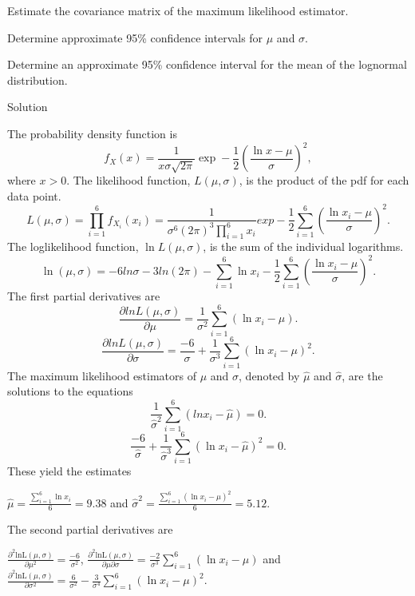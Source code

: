 \documentclass[]{book}
\begin{document}
Estimate the covariance matrix of the maximum likelihood estimator.

Determine approximate 95\% confidence intervals for \(\mu\) and
\(\sigma\).

Determine an approximate 95\% confidence interval for the mean of the
lognormal distribution.

Solution

The probability density function is
\[f_{X}\left( x \right) = \frac{1}{x \sigma \sqrt{2\pi}}\exp - \frac{1}{2}\left( \frac{\ln x - \mu}{\sigma} \right)^{2},\]
where \(x > 0\). The likelihood function,
\(L\left( \mu,\sigma \right)\), is the product of the pdf for each data
point.
\[L\left( \mu,\sigma \right) = \prod_{i = 1}^{6}{f_{X_{i}}\left( x_{i} \right)} = \frac{1}{\sigma^{6}\left( 2\pi \right)^{3}\prod_{i = 1}^{6}x_{i}}exp - \frac{1}{2}\sum_{i = 1}^{6}\left( \frac{\ln x_{i} - \mu}{\sigma} \right)^{2}.\]
The loglikelihood function, \(\ln L \left( \mu,\sigma \right)\), is the
sum of the individual logarithms.
\[\ln \left( \mu,\sigma \right) = - 6ln\sigma - 3ln\left( 2\pi \right) - \sum_{i = 1}^{6}\ln x_{i} - \frac{1}{2}\sum_{i = 1}^{6}\left( \frac{\ln x_{i} - \mu}{\sigma} \right)^{2}.\]
The first partial derivatives are
\[\frac{\partial lnL\left( \mu,\sigma \right)}{\partial\mu} = \frac{1}{\sigma^{2}}\sum_{i = 1}^{6}\left( \ln x_{i} - \mu \right).\]
\[\frac{\partial lnL\left( \mu,\sigma \right)}{\partial\sigma} = \frac{- 6}{\sigma} + \frac{1}{\sigma^{3}}\sum_{i = 1}^{6}\left( \ln x_{i} - \mu \right)^{2}.\]
The maximum likelihood estimators of \(\mu\) and \(\sigma\), denoted by
\(\hat{\mu}\) and \(\hat{\sigma}\), are the solutions to the equations
\[\frac{1}{{\hat{\sigma}}^{2}}\sum_{i = 1}^{6}\left( lnx_{i} - \hat{\mu} \right) = 0.\]
\[\frac{- 6}{\hat{\sigma}} + \frac{1}{{\hat{\sigma}}^{3}}\sum_{i = 1}^{6}\left( \ln x_{i} - \hat{\mu} \right)^{2} = 0.\]
These yield the estimates

\(\hat{\mu} = \frac{\sum_{i = 1}^{6}{\ln x_{i}}}{6} = 9.38\) and
\({\hat{\sigma}}^{2} = \frac{\sum_{i = 1}^{6}\left( \ln x_{i} - \hat{\mu} \right)^{2}}{6} = 5.12\).

The second partial derivatives are

\(\frac{\partial^{2}\text{lnL}\left( \mu,\sigma \right)}{\partial\mu^{2}} = \frac{- 6}{\sigma^{2}}\),
\(\frac{\partial^{2}\text{lnL}\left( \mu,\sigma \right)}{\partial\mu\partial\sigma} = \frac{- 2}{\sigma^{3}}\sum_{i = 1}^{6}\left( \ln x_{i} - \mu \right)\)
and
\(\frac{\partial^{2}\text{lnL}\left( \mu,\sigma \right)}{\partial\sigma^{2}} = \frac{6}{\sigma^{2}} - \frac{3}{\sigma^{4}}\sum_{i = 1}^{6}\left( \ln x_{i} - \mu \right)^{2}\).
\end{document}
